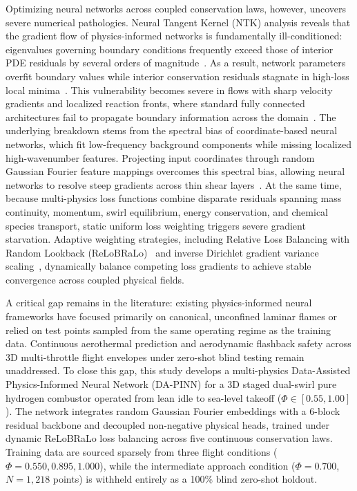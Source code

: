 \documentclass[reprint,aps,prfluids,superscriptaddress,twocolumn,floatfix]{revtex4-2}
\begin{document}
Optimizing neural networks across coupled conservation laws, however, uncovers severe numerical pathologies. Neural Tangent Kernel (NTK) analysis reveals that the gradient flow of physics-informed networks is fundamentally ill-conditioned: eigenvalues governing boundary conditions frequently exceed those of interior PDE residuals by several orders of magnitude~\cite{wang2022when}. As a result, network parameters overfit boundary values while interior conservation residuals stagnate in high-loss local minima~\cite{wang2023experts}. This vulnerability becomes severe in flows with sharp velocity gradients and localized reaction fronts, where standard fully connected architectures fail to propagate boundary information across the domain~\cite{krishnapriyan2021characterizing}. The underlying breakdown stems from the spectral bias of coordinate-based neural networks, which fit low-frequency background components while missing localized high-wavenumber features. Projecting input coordinates through random Gaussian Fourier feature mappings overcomes this spectral bias, allowing neural networks to resolve steep gradients across thin shear layers~\cite{tancik2020fourier}. At the same time, because multi-physics loss functions combine disparate residuals spanning mass continuity, momentum, swirl equilibrium, energy conservation, and chemical species transport, static uniform loss weighting triggers severe gradient starvation. Adaptive weighting strategies, including Relative Loss Balancing with Random Lookback (ReLoBRaLo)~\cite{bischof2025relobralo} and inverse Dirichlet gradient variance scaling~\cite{maddu2022inverse}, dynamically balance competing loss gradients to achieve stable convergence across coupled physical fields.

A critical gap remains in the literature: existing physics-informed neural frameworks have focused primarily on canonical, unconfined laminar flames or relied on test points sampled from the same operating regime as the training data. Continuous aerothermal prediction and aerodynamic flashback safety across 3D multi-throttle flight envelopes under zero-shot blind testing remain unaddressed. To close this gap, this study develops a multi-physics Data-Assisted Physics-Informed Neural Network (DA-PINN) for a 3D staged dual-swirl pure hydrogen combustor operated from lean idle to sea-level takeoff ($\Phi \in [0.55, 1.00]$). The network integrates random Gaussian Fourier embeddings with a 6-block residual backbone and decoupled non-negative physical heads, trained under dynamic ReLoBRaLo loss balancing across five continuous conservation laws. Training data are sourced sparsely from three flight conditions ($\Phi = 0.550, 0.895, 1.000$), while the intermediate approach condition ($\Phi = 0.700$, $N = 1,218$ points) is withheld entirely as a 100\% blind zero-shot holdout.
\end{document}
